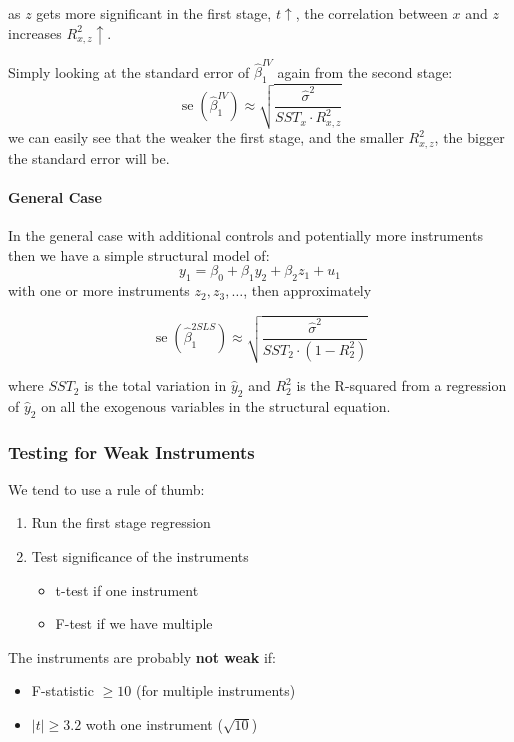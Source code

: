 \documentclass[11pt]{article}
\begin{document}
as $z$ gets more significant in the first stage, $t\uparrow$, the correlation between $x$ and $z$ increases $R_{x,z}^2\uparrow$.

Simply looking at the standard error of $\hat{\beta}_1^{IV}$ again from the second stage:
\begin{equation}
\operatorname{se}\left(\hat{\beta}_1^{I V}\right) \approx \sqrt{\frac{\hat{\sigma}^2}{S S T_x \cdot R_{x, z}^2}}
\end{equation}
we can easily see that the weaker the first stage, and the smaller $R_{x,z}^2$, the bigger the standard error will be.

\paragraph{General Case} \mbox{}

In the general case with additional controls and potentially more instruments then we have a simple structural model of:
\[y_1 = \beta_0 + \beta_1 y_2 + \beta_2 z_1 + u_1\]
with one or more instruments $z_2,z_3, \ldots$, then approximately

\begin{equation}
\operatorname{se}\left(\hat{\beta}_1^{2 S L S}\right) \approx \sqrt{\frac{\hat{\sigma}^2}{S S T_2 \cdot\left(1-R_2^2\right)}}
\end{equation}

where $SST_2$ is the total variation in $\hat{y}_2$ and $R_2^2$ is the R-squared from a regression of $\hat{y}_2$ on all the exogenous variables in the structural equation.

\subsubsection{Testing for Weak Instruments}
\begin{procedure}
We tend to use a rule of thumb:    
\begin{enumerate}
    \item Run the first stage regression
    \item Test significance of the instruments
    \begin{itemize}
        \item t-test if one instrument
        \item F-test if we have multiple
    \end{itemize}
\end{enumerate}
The instruments are probably \textbf{not weak} if:
\begin{itemize}
    \item F-statistic $\geq 10$ (for multiple instruments)
    \item $|t| \geq 3.2$ woth one instrument ($\sqrt{10}$)
\end{itemize}
\end{procedure}
\end{document}
